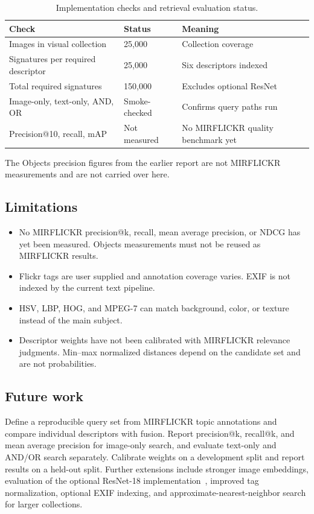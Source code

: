 \documentclass[12pt,a4paper]{article}
\begin{document}
\begin{table}[H]
\centering
\small
\begin{tabular}{p{}p{}p{}}
\toprule
\textbf{Check} & \textbf{Status} & \textbf{Meaning}\\
\midrule
Images in visual collection & 25,000 & Collection coverage\\
Signatures per required descriptor & 25,000 & Six descriptors indexed\\
Total required signatures & 150,000 & Excludes optional ResNet\\
Image-only, text-only, AND, OR & Smoke-checked & Confirms query paths run\\
Precision@10, recall, mAP & Not measured & No MIRFLICKR quality benchmark yet\\
\bottomrule
\end{tabular}
\caption{Implementation checks and retrieval evaluation status.}
\label{tab:evaluation-status}
\end{table}

The Objects precision figures from the earlier report are not MIRFLICKR
measurements and are not carried over here.

\subsection{Limitations}
\begin{itemize}
\item No MIRFLICKR precision@k, recall, mean average precision, or NDCG has yet
been measured. Objects measurements must not be reused as MIRFLICKR results.
\item Flickr tags are user supplied and annotation coverage varies. EXIF is
not indexed by the current text pipeline.
\item HSV, LBP, HOG, and MPEG-7 can match background, color, or texture instead
of the main subject.
\item Descriptor weights have not been calibrated with MIRFLICKR relevance
judgments. Min--max normalized distances depend on the candidate set and are
not probabilities.
\end{itemize}

\subsection{Future work}
Define a reproducible query set from MIRFLICKR topic annotations and compare
individual descriptors with fusion. Report precision@k, recall@k, and mean
average precision for image-only search, and evaluate text-only and AND/OR
search separately. Calibrate weights on a development split and report results
on a held-out split. Further extensions include stronger image embeddings,
evaluation of the optional ResNet-18 implementation~\cite{he2016}, improved tag
normalization, optional EXIF indexing, and approximate-nearest-neighbor search
for larger collections.
\end{document}
